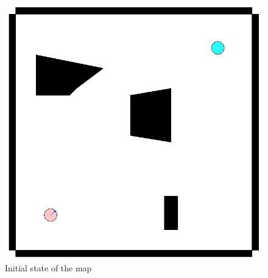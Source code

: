 \documentclass{report}
\begin{document}
\begin{figure}
\begin{minipage}{\linewidth}
\begin{minipage}[t]{0.45\linewidth}
    \centering
    \includegraphics[width=\linewidth]{ray1.png}
    \captionsetup{singlelinecheck=off}
    \caption[.]{\label{fig:ray1}Initial state of the map}
\end{minipage}
\hfill
\begin{minipage}[t]{0.45\linewidth}
    \centering
    

\end{minipage}
\end{minipage}
\end{figure}
\end{document}
